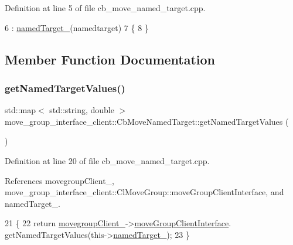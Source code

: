 Definition at line 5 of file cb\+\_\+move\+\_\+named\+\_\+target.\+cpp.


\begin{DoxyCode}
6 : \hyperlink{classmove__group__interface__client_1_1CbMoveNamedTarget_a1e985a12ca30e0c6946a28940504f036}{namedTarget\_}(namedtarget)
7 \{
8 \}
\end{DoxyCode}


\subsection{Member Function Documentation}
\mbox{\label{classmove__group__interface__client_1_1CbMoveNamedTarget_acd3ec1b41ad37f2d441b66cdedc63b95}} 
\subsubsection{\texorpdfstring{get\+Named\+Target\+Values()}{getNamedTargetValues()}}
{\footnotesize\ttfamily std\+::map$<$ std\+::string, double $>$ move\+\_\+group\+\_\+interface\+\_\+client\+::\+Cb\+Move\+Named\+Target\+::get\+Named\+Target\+Values (\begin{DoxyParamCaption}{ }\end{DoxyParamCaption})}



Definition at line 20 of file cb\+\_\+move\+\_\+named\+\_\+target.\+cpp.



References movegroup\+Client\+\_\+, move\+\_\+group\+\_\+interface\+\_\+client\+::\+Cl\+Move\+Group\+::move\+Group\+Client\+Interface, and named\+Target\+\_\+.


\begin{DoxyCode}
21 \{
22     \textcolor{keywordflow}{return} \hyperlink{classmove__group__interface__client_1_1CbMoveNamedTarget_acd7b16a1c38b103c0624fad1dfd99176}{movegroupClient\_}->\hyperlink{classmove__group__interface__client_1_1ClMoveGroup_a5f0ea9b52695661b17605691168d1f31}{moveGroupClientInterface}.
      getNamedTargetValues(this->\hyperlink{classmove__group__interface__client_1_1CbMoveNamedTarget_a1e985a12ca30e0c6946a28940504f036}{namedTarget\_});
23 \}
\end{DoxyCode}
\mbox{\label{classmove__group__interface__client_1_1CbMoveNamedTarget_afe138151340dafa14cb88051e82f0c8e}} 
